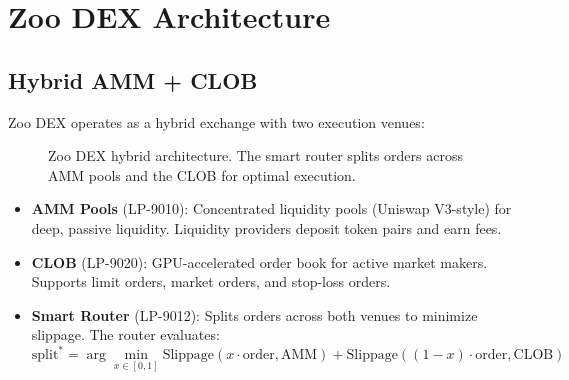 \section{Zoo DEX Architecture}

\label{sec:architecture}

\subsection{Hybrid AMM + CLOB}

Zoo DEX operates as a hybrid exchange with two execution venues:

\begin{figure}[t]
\centering
{}
\caption{Zoo DEX hybrid architecture. The smart router splits orders across AMM pools and the CLOB for optimal execution.}
\label{fig:architecture}
\end{figure}

\begin{itemize}
    \item \textbf{AMM Pools} (LP-9010): Concentrated liquidity pools (Uniswap V3-style) for deep, passive liquidity. Liquidity providers deposit token pairs and earn fees.

    \item \textbf{CLOB} (LP-9020): GPU-accelerated order book for active market makers. Supports limit orders, market orders, and stop-loss orders.

    \item \textbf{Smart Router} (LP-9012): Splits orders across both venues to minimize slippage. The router evaluates:
    \begin{equation}
    \text{split}^* = \arg\min_{x \in [0, 1]} \text{Slippage}(x \cdot \text{order}, \text{AMM}) + \text{Slippage}((1-x) \cdot \text{order}, \text{CLOB})
    \end{equation}
\end{itemize}

